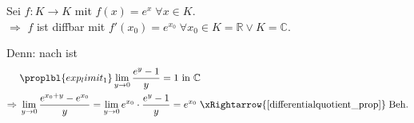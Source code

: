\begin{example}[Exponentialfunktion]
	Sei $f:K\to K$ mit $f(x) = e^x\;\forall x\in K$.\\
	$\Rightarrow$ $f$ ist \gls{diffbar} mit $f'(x_0) = e^{x_0}\;\forall x_0\in K = \mathbb{R}\lor K=\mathbb{C}$.
	
	Denn: nach  ist \begin{align}
		& \proplbl{exp_limit_1} \lim\limits_{y\to 0} \frac{e^y - 1}{y} = 1 \text{ in } \mathbb{C} \\
		\notag \Rightarrow\;& \lim\limits_{y\to 0} \frac{e^{x_0 + y} - e^{x_0}}{y} = \lim\limits_{y\to 0} e^{x_0} \cdot \frac{e^y - 1}{y} = e^{x_0} \;\xRightarrow{\eqref{differentialquotient_prop}}\; \text{Beh.}
	\end{align}
	
	\begin{center}\end{center}
\end{example}

